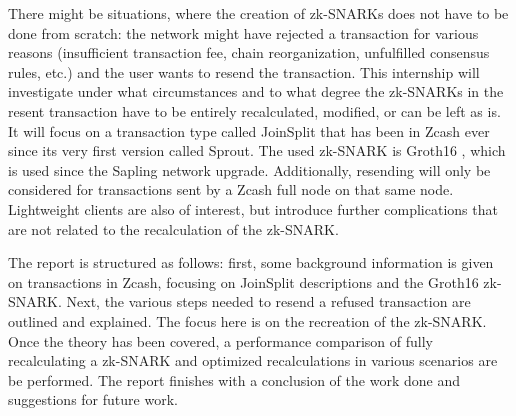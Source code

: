 \documentclass{article}
\begin{document}
There might be situations, where the creation of zk-SNARKs does not have to be done from scratch: the network might have rejected a transaction for various reasons (insufficient transaction fee, chain reorganization, unfulfilled consensus rules, etc.) and the user wants to resend the transaction.
This internship will investigate under what circumstances and to what degree the zk-SNARKs in the resent transaction have to be entirely recalculated, modified, or can be left as is.
It will focus on a transaction type called JoinSplit that has been in Zcash ever since its very first version called Sprout.
The used zk-SNARK is Groth16 \cite{groth:zksnark}, which is used since the Sapling network upgrade.
Additionally, resending will only be considered for transactions sent by a Zcash full node on that same node.
Lightweight clients are also of interest, but introduce further complications that are not related to the recalculation of the zk-SNARK.

The report is structured as follows: first, some background information is given on transactions in Zcash, focusing on JoinSplit descriptions and the Groth16 zk-SNARK.
Next, the various steps needed to resend a refused transaction are outlined and explained.
The focus here is on the recreation of the zk-SNARK.
Once the theory has been covered, a performance comparison of fully recalculating a zk-SNARK and optimized recalculations in various scenarios are be performed.
The report finishes with a conclusion of the work done and suggestions for future work.

\end{document}
